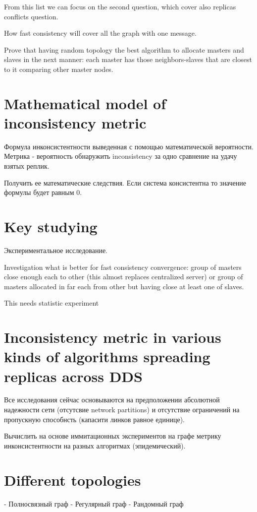 \documentclass{llncs}
\begin{document}
From this list we can focus on the second question, which cover also replicas conflicts question.

How fast consistency will cover all the graph with one message.

Prove that having random topology the best algorithm to allocate masters and slaves
in the next manner: each master has those neighbors-slaves that are closest to it comparing
other master nodes.

\section{Mathematical model of inconsistency metric}

Формула инконсистентности выведенная с помощью математической вероятности.
Метрика - вероятность обнаружить inconsistency за одно сравнение на удачу взятых реплик.

Получить ее математические следствия.
Если система консистентна то значение формулы будет равным 0.

\section{Key studying}\label{sec:experiments}

Экспериментальное исследование.

Investigation what is better for fast consistency convergence:
group of masters close enough each to other (this almost replaces centralized server)
or group of masters allocated in far each from other but having close at least one of slaves.

This needs statistic experiment

\section{Inconsistency metric in various kinds of algorithms spreading replicas across DDS}
Все исследования сейчас основываются на предположении абсолютной надежности сети (отсутсвие network partitions) и отсутствие ограничений на пропускную способнсть (капасити линков равное единице).

Вычислить на основе иммитационных экспериментов на графе метрику инконсистентности на разных алгоритмах (эпидемический).

\section{Different topologies}
- Полносвязный граф
- Регулярный граф
- Рандомный граф
\end{document}
